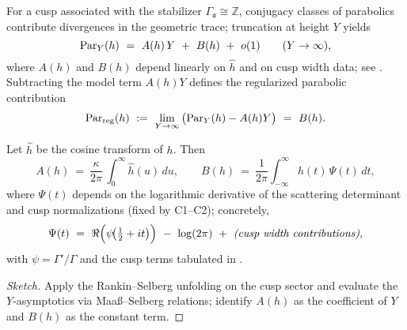 For a cusp associated with the stabilizer $\Gamma_\mathfrak{a}\cong \mathbb{Z}$, conjugacy classes of parabolics contribute divergences in the geometric trace; truncation at height $Y$ yields
\begin{equation}\relax\hspace{0pt}
\label{eq:tfc4-par-Y}\relax\hspace{0pt}
\mathrm{Par}_Y(h)\ =\ A(h)\,Y\ +\ B(h)\ +\ o(1)\qquad (Y\to\infty),
\end{equation}
where $A(h)$ and $B(h)$ depend linearly on $\widehat{h}$ and on cusp width data; see \cite{HejhalII,Borthwick}. \relax\hspace{0pt}
Subtracting the model term $A(h)Y$ defines the regularized parabolic contribution
\begin{equation}\relax\hspace{0pt}
\label{eq:tfc4-par-reg}\relax\hspace{0pt}
\mathrm{Par}_{\mathrm{reg}}(h)\ :=\ \lim_{Y\to\infty}\big(\mathrm{Par}_Y(h)-A(h)Y\big)\ =\ B(h).
\end{equation}

\begin{proposition}\relax\hspace{0pt}
\label{prop:tfc4-par-AB} %
Let $\widehat{h}$ be the cosine transform of $h$. Then
\[
A(h)\ =\ \frac{\kappa}{2\pi}\,\int_{0}^{\infty}\widehat{h}(u)\,du,\qquad
B(h)\ =\ \frac{1}{2\pi}\int_{-\infty}^{\infty}h(t)\,\Psi(t)\,dt,
\]
where $\Psi(t)$ depends on the logarithmic derivative of the scattering determinant and cusp normalizations (fixed by C1--C2); concretely,
\[
\Psi(t)\ =\ \Re\Big(\psi\!\big(\tfrac12+it\big)\Big)\ -\ \log(2\pi)\ +\ \text{\emph{(cusp width contributions)}},
\]
with $\psi=\Gamma'/\Gamma$ and the cusp terms tabulated in \cite{HejhalII,Borthwick}. \relax\hspace{0pt}
\end{proposition}

\begin{proof}[Sketch]\relax\hspace{0pt}
Apply the Rankin--Selberg unfolding on the cusp sector and evaluate the $Y$-asymptotics via Maaß--Selberg relations; identify $A(h)$ as the coefficient of $Y$ and $B(h)$ as the constant term. \relax\hspace{0pt}
\end{proof}

